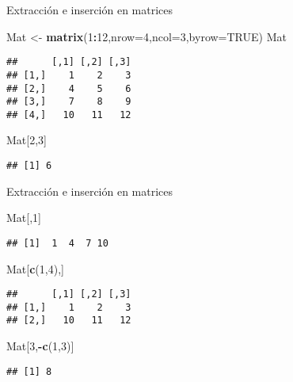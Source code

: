 \documentclass[ignorenonframetext,]{beamer}
\newenvironment{Shaded}{\begin{snugshade}}{\end{snugshade}}
\newcommand{\KeywordTok}[1]{\textcolor[rgb]{0.13,0.29,0.53}{\textbf{#1}}}
\newcommand{\DataTypeTok}[1]{\textcolor[rgb]{0.13,0.29,0.53}{#1}}
\newcommand{\DecValTok}[1]{\textcolor[rgb]{0.00,0.00,0.81}{#1}}
\newcommand{\StringTok}[1]{\textcolor[rgb]{0.31,0.60,0.02}{#1}}
\newcommand{\OtherTok}[1]{\textcolor[rgb]{0.56,0.35,0.01}{#1}}
\newcommand{\OperatorTok}[1]{\textcolor[rgb]{0.81,0.36,0.00}{\textbf{#1}}}
\newcommand{\NormalTok}[1]{#1}
\begin{document}
\begin{frame}[fragile]{Extracción e inserción en matrices}

\begin{Shaded}
\begin{Highlighting}[]
\NormalTok{Mat <-}\StringTok{ }\KeywordTok{matrix}\NormalTok{(}\DecValTok{1}\OperatorTok{:}\DecValTok{12}\NormalTok{,}\DataTypeTok{nrow=}\DecValTok{4}\NormalTok{,}\DataTypeTok{ncol=}\DecValTok{3}\NormalTok{,}\DataTypeTok{byrow=}\OtherTok{TRUE}\NormalTok{)}
\NormalTok{Mat}
\end{Highlighting}
\end{Shaded}
\pause
\begin{verbatim}
##      [,1] [,2] [,3]
## [1,]    1    2    3
## [2,]    4    5    6
## [3,]    7    8    9
## [4,]   10   11   12
\end{verbatim}

\begin{Shaded}
\begin{Highlighting}[]
\NormalTok{Mat[}\DecValTok{2}\NormalTok{,}\DecValTok{3}\NormalTok{]}
\end{Highlighting}
\end{Shaded}
\pause
\begin{verbatim}
## [1] 6
\end{verbatim}

\end{frame}

\begin{frame}[fragile]{Extracción e inserción en matrices}

\begin{Shaded}
\begin{Highlighting}[]
\NormalTok{Mat[,}\DecValTok{1}\NormalTok{]}
\end{Highlighting}
\end{Shaded}
\pause
\begin{verbatim}
## [1]  1  4  7 10
\end{verbatim}

\begin{Shaded}
\begin{Highlighting}[]
\NormalTok{Mat[}\KeywordTok{c}\NormalTok{(}\DecValTok{1}\NormalTok{,}\DecValTok{4}\NormalTok{),]}
\end{Highlighting}
\end{Shaded}
\pause
\begin{verbatim}
##      [,1] [,2] [,3]
## [1,]    1    2    3
## [2,]   10   11   12
\end{verbatim}

\begin{Shaded}
\begin{Highlighting}[]
\NormalTok{Mat[}\DecValTok{3}\NormalTok{,}\OperatorTok{-}\KeywordTok{c}\NormalTok{(}\DecValTok{1}\NormalTok{,}\DecValTok{3}\NormalTok{)]}
\end{Highlighting}
\end{Shaded}
\pause
\begin{verbatim}
## [1] 8
\end{verbatim}

\end{frame}
\end{document}
